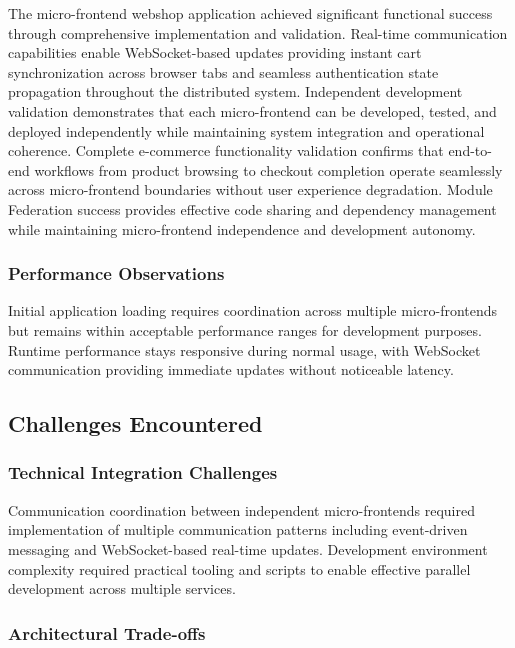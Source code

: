 \documentclass[12pt,a4paper]{report}
\begin{document}
The micro-frontend webshop application achieved significant functional success through comprehensive implementation and validation. Real-time communication capabilities enable WebSocket-based updates providing instant cart synchronization across browser tabs and seamless authentication state propagation throughout the distributed system. Independent development validation demonstrates that each micro-frontend can be developed, tested, and deployed independently while maintaining system integration and operational coherence. Complete e-commerce functionality validation confirms that end-to-end workflows from product browsing to checkout completion operate seamlessly across micro-frontend boundaries without user experience degradation. Module Federation success provides effective code sharing and dependency management while maintaining micro-frontend independence and development autonomy.

\subsubsection{Performance Observations}

Initial application loading requires coordination across multiple micro-frontends but remains within acceptable performance ranges for development purposes. Runtime performance stays responsive during normal usage, with WebSocket communication providing immediate updates without noticeable latency.

\subsection{Challenges Encountered}

\subsubsection{Technical Integration Challenges}

Communication coordination between independent micro-frontends required implementation of multiple communication patterns including event-driven messaging and WebSocket-based real-time updates. Development environment complexity required practical tooling and scripts to enable effective parallel development across multiple services.

\subsubsection{Architectural Trade-offs}
\end{document}
